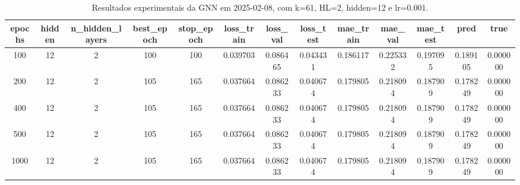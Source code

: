 \begin{table}[h]
\centering
\caption{Resultados experimentais da GNN em 2025-02-08, com k=61, HL=2, hidden=12 e lr=0.001.}
\label{tab:gnn_results_k61_hl2_h12_d20250208}
\begin{tabular}{ccccccccccccc}
\toprule
epochs & hidden & n\_hidden\_layers & best\_epoch & stop\_epoch & loss\_train & loss\_val & loss\_test & mae\_train & mae\_val & mae\_test & pred & true \\
\midrule
100 & 12 & 2 & 100 & 100 & 0.039703 & 0.086465 & 0.043431 & 0.186117 & 0.225332 & 0.197095 & 0.189105 & 0.000000 \\
200 & 12 & 2 & 105 & 165 & 0.037664 & 0.086233 & 0.040674 & 0.179805 & 0.218094 & 0.187909 & 0.178249 & 0.000000 \\
400 & 12 & 2 & 105 & 165 & 0.037664 & 0.086233 & 0.040674 & 0.179805 & 0.218094 & 0.187909 & 0.178249 & 0.000000 \\
500 & 12 & 2 & 105 & 165 & 0.037664 & 0.086233 & 0.040674 & 0.179805 & 0.218094 & 0.187909 & 0.178249 & 0.000000 \\
1000 & 12 & 2 & 105 & 165 & 0.037664 & 0.086233 & 0.040674 & 0.179805 & 0.218094 & 0.187909 & 0.178249 & 0.000000 \\
\bottomrule
\end{tabular}
\end{table}
